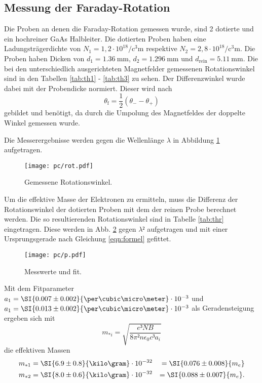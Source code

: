 \subsection{Messung der Faraday-Rotation}
Die Proben an denen die Faraday-Rotation gemessen wurde, sind 2 dotierte und ein hochreiner GaAs Halbleiter.
Die dotierten Proben haben eine Ladungsträgerdichte von $N_1 =  1{,}2 \cdot 10^{18} \si{\per\cubic\centi\meter}$ respektive $N_2 = 2{,}8 \cdot 10^{18} \si{\per\cubic\centi\meter}$.
Die Proben haben Dicken von $d_1 = \SI{1.36}{\milli\meter}$, $d_2 = \SI{1.296}{\milli\meter}$ und $d_\text{rein} = \SI{5.11}{\milli\meter}$.
Die bei den unterschiedlich ausgerichteten Magnetfelder gemessenen Rotationswinkel sind in den Tabellen \ref{tab:th1} - \ref{tab:th3} zu sehen.
Der Differenzwinkel wurde dabei mit der Probendicke normiert.
Dieser wird nach 
\begin{equation}
	\theta_\text{f} = \frac{1}{2}(\theta_- -\theta_+)
\end{equation}
gebildet und benötigt, da durch die Umpolung des Magnetfeldes der doppelte Winkel gemessen wurde.



Die Messerergebnisse werden gegen die Wellenlänge $\lambda$ in Abbildung \ref{fig:rot} aufgetragen.
\begin{figure}
	\centering
	\texttt{[image: pc/rot.pdf]}
	\caption{Gemessene Rotationswinkel.}
	\label{fig:rot}
\end{figure}
Um die effektive Masse der Elektronen zu ermitteln, muss die Differenz der Rotationswinkel der dotierten Proben mit dem der reinen Probe berechnet werden. Die so resultierenden Rotationswinkel sind in Tabelle \ref{tab:thr} eingetragen.
Diese werden in Abb. \ref{fig:p} gegen $\lambda²$ aufgetragen und mit einer Ursprungsgerade nach Gleichung \eqref{eqn:formel} gefittet.
\begin{figure}
	\centering
	\texttt{[image: pc/p.pdf]}
	\caption{Messwerte und fit.}
	\label{fig:p}
\end{figure}
Mit dem Fitparameter $a_1 = \SI{0.007\pm0.002}{\per\cubic\micro\meter}\cdot 10^{-3}$ und $a_1 = \SI{0.013\pm0.002}{\per\cubic\micro\meter}\cdot10^{-3}$ als Geradensteigung ergeben sich mit
\begin{equation}
	m_{*i} = \sqrt{\frac{e³NB}{8\pi² n \epsilon_0 c³ a_i}}
\end{equation}
die effektiven Massen
\begin{align}
	m_{*1} &= \SI{6.9\pm0.8}{\kilo\gram}\cdot10^{-32} &= \SI{0.076\pm0.008}{m_e}\\
	m_{*2} &= \SI{8.0\pm0.6}{\kilo\gram}\cdot10^{-32} &= \SI{0.088\pm0.007}{m_e}\text.
\end{align}

